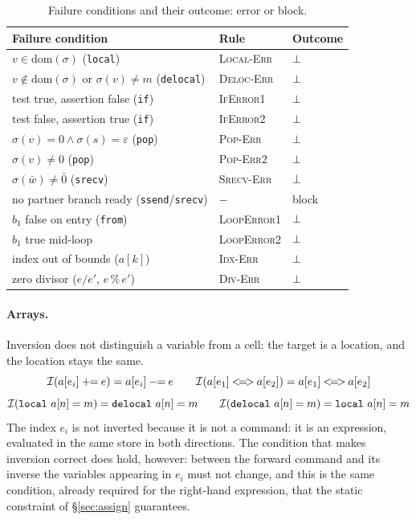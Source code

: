\begin{table}[H]
\centering
\renewcommand{\arraystretch}{1.25}
\begin{tabular}{l l l}
\hline
\textbf{Failure condition} & \textbf{Rule} & \textbf{Outcome}\\
\hline
$v \in \mathrm{dom}(\sigma)$ (\texttt{local}) & \textcolor{red!60!black}{\textsc{Local-Err}} & $\bot$\\
$v \notin \mathrm{dom}(\sigma)$ or $\sigma(v) \neq m$ (\texttt{delocal}) & \textcolor{red!60!black}{\textsc{Deloc-Err}} & $\bot$\\
test true, assertion false (\texttt{if}) & \textcolor{red!60!black}{\textsc{IfError1}} & $\bot$\\
test false, assertion true (\texttt{if}) & \textcolor{red!60!black}{\textsc{IfError2}} & $\bot$\\
$\sigma(v) = 0 \land \sigma(s) = \varepsilon$ (\texttt{pop}) & \textcolor{red!60!black}{\textsc{Pop-Err}} & $\bot$\\
$\sigma(v) \neq 0$ (\texttt{pop}) & \textcolor{red!60!black}{\textsc{Pop-Err2}} & $\bot$\\
$\sigma(\bar w) \neq \bar 0$ (\texttt{srecv}) & \textcolor{red!60!black}{\textsc{Srecv-Err}} & $\bot$\\
no partner branch ready (\texttt{ssend}/\texttt{srecv}) & $-$ & block\\
$b_1$ false on entry (\texttt{from}) & \textcolor{red!60!black}{\textsc{LoopError1}} & $\bot$\\
$b_1$ true mid-loop & \textcolor{red!60!black}{\textsc{LoopError2}} & $\bot$\\
index out of bounds ($a[k]$) & \textcolor{red!60!black}{\textsc{Idx-Err}} & $\bot$\\
zero divisor ($e/e'$, $e\,\%\,e'$) & \textcolor{red!60!black}{\textsc{Div-Err}} & $\bot$\\
\hline
\end{tabular}
\caption{Failure conditions and their outcome: error or block.}
\label{tab:fallimenti}
\end{table}

\paragraph{Arrays.} Inversion does not distinguish a variable from a cell: the
target is a location, and the location stays the same.
\[
\Inv{a[e_i] \mathbin{+\!\!=} e} = a[e_i] \mathbin{-\!\!=} e
\qquad
\Inv{a[e_1] \mathbin{<\!=\!>} a[e_2]} = a[e_1] \mathbin{<\!=\!>} a[e_2]
\]
\[
\mathcal{I}(\mathtt{local}\ a[n] = m) = \mathtt{delocal}\ a[n] = m
\qquad
\mathcal{I}(\mathtt{delocal}\ a[n] = m) = \mathtt{local}\ a[n] = m
\]
The index $e_i$ is not inverted because it is not a command: it is an expression,
evaluated in the same store in both directions. The condition that
makes inversion correct does hold, however: between the forward command and its inverse the
variables appearing in $e_i$ must not change, and this is the same
condition, already required for the right-hand expression, that the static constraint of
\S\ref{sec:assign} guarantees.

